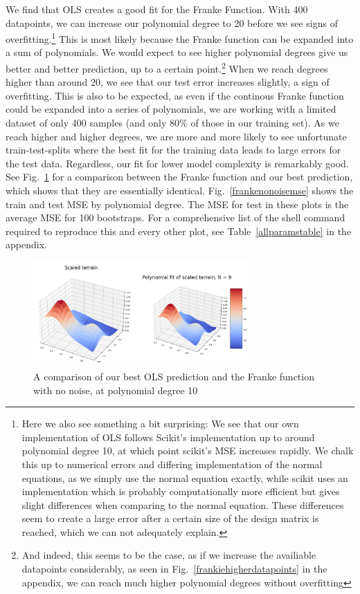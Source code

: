 \documentclass[twocolumn,10pt,cleanfoot]{asme2ej}
\begin{document}
We find that OLS creates a good fit for the Franke Function. With 400 datapoints, we can increase our polynomial degree to 20 before we see signs of overfitting.\footnote{Here we also see something a bit surprising: We see that our own implementation of OLS follows Scikit's implementation up to around polynomial degree 10, at which point scikit's MSE increases rapidly. We chalk this up to numerical errors and differing implementation of the normal equations, as we simply use the normal equation exactly, while scikit uses an implementation which is probably computationally more efficient but gives slight differences when comparing to the normal equation. These differences seem to create a large error after a certain size of the design matrix is reached, which we can not adequately explain.} This is most likely because the Franke function can be expanded into a sum of polynomials. We would expect to see higher polynomial degrees give us better and better prediction, up to a certain point.\footnote{And indeed, this seems to be the case, as if we increase the availiable datapoints considerably, as seen in Fig.~\ref{frankiehigherdatapoints} in the appendix, we can reach much higher polynomial degrees without overfitting} When we reach degrees higher than around 20, we see that our test error increases slightly, a sign of overfitting. This is also to be expected, as even if the continous Franke function could be expanded into a series of polynomials, we are working with a limited dataset of only 400 samples (and only 80\% of those in our training set). As we reach higher and higher degrees, we are more and more likely to see unfortunate train-test-splits where the best fit for the training data leads to large errors for the test data. Regardless, our fit for lower model complexity is remarkably good. See Fig.~\ref{frankenonoise} for a comparison between the Franke function and our best prediction, which shows that they are essentially identical. Fig.~\ref{frankenonoisemse} shows the train and test MSE by polynomial degree. The MSE for test in these plots is the average MSE for 100 bootstraps. For a comprehensive list of the shell command required to reproduce this and every other plot, see Table~\ref{allparamstable} in the appendix.

\begin{figure}[h]
\centerline{\includegraphics[width=3.25in]{figure/frankenonoise.png}}
\caption{A comparison of our best OLS prediction and the Franke function with no noise, at polynomial degree 10}
\label{frankenonoise}
\end{figure}
\end{document}
